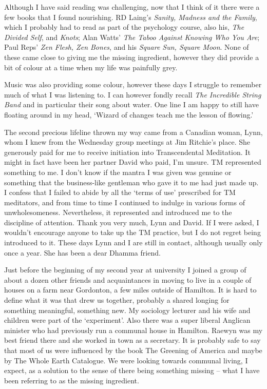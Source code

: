 Although I have said reading was challenging, now that I think of it
there were a few books that I found nourishing. RD Laing's \emph{Sanity,
Madness and the Family}, which I probably had to read as part of the
psychology course, also his, \emph{The Divided Self}, and \emph{Knots};
Alan Watts' \emph{The Taboo Against Knowing Who You Are}; Paul Reps'
\emph{Zen Flesh, Zen Bones}, and his \emph{Square Sun, Square Moon}.
None of these came close to giving me the missing ingredient, however
they did provide a bit of colour at a time when my life was painfully
grey.

Music was also providing some colour, however these days I struggle to
remember much of what I was listening to. I can however fondly recall
\emph{The Incredible String Band} and in particular their song about
water. One line I am happy to still have floating around in my head,
`Wizard of changes teach me the lesson of flowing.'

The second precious lifeline thrown my way came from a Canadian woman,
Lynn, whom I knew from the Wednesday group meetings at Jim Ritchie's
place. She generously paid for me to receive initiation into
Transcendental Meditation. It might in fact have been her partner David
who paid, I'm unsure. TM represented something to me. I don't know if
the mantra I was given was genuine or something that the business-like
gentleman who gave it to me had just made up. I confess that I failed to
abide by all the `terms of use' prescribed for TM meditators, and from
time to time I continued to indulge in various forms of unwholesomeness.
Nevertheless, it represented and introduced me to the discipline of
attention. Thank you very much, Lynn and David. If I were asked, I
wouldn't encourage anyone to take up the TM practice, but I do not
regret being introduced to it. These days Lynn and I are still in
contact, although usually only once a year. She has been a dear Dhamma
friend.

Just before the beginning of my second year at university I joined a
group of about a dozen other friends and acquaintances in moving to live
in a couple of houses on a farm near Gordonton, a few miles outside of
Hamilton. It is hard to define what it was that drew us together,
probably a shared longing for something meaningful, something new. My
sociology lecturer and his wife and children were part of the
`experiment'. Also there was a super liberal Anglican minister who had
previously run a communal house in Hamilton. Raewyn was my best friend
there and she worked in town as a secretary. It is probably safe to say
that most of us were influenced by the book The Greening of America\cite{greening}
and maybe by The Whole Earth Catalogue\cite{earth}.
We were looking towards communal living, I expect, as a solution to the sense of there being something
missing -- what I have been referring to as the missing ingredient.

